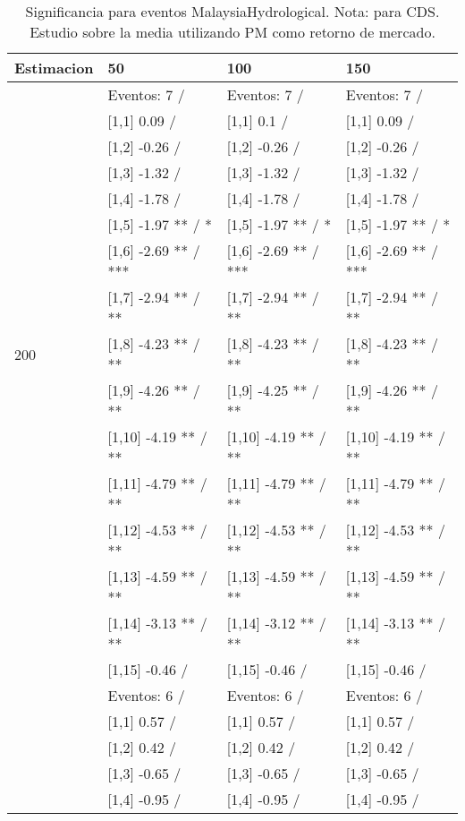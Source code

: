 \begin{table}

\caption{Significancia para eventos MalaysiaHydrological. Nota: para CDS. Estudio sobre la media utilizando PM como retorno de mercado.}
\centering
\begin{tabular}[t]{llll}
\toprule
Estimacion & 50 & 100 & 150\\
\midrule
 & Eventos:  7 / & Eventos:  7 / & Eventos:  7 /\\
 & {}[1,1] 0.09  / & {}[1,1] 0.1  / & {}[1,1] 0.09  /\\
 & {}[1,2] -0.26  / & {}[1,2] -0.26  / & {}[1,2] -0.26  /\\
 & {}[1,3] -1.32  / & {}[1,3] -1.32  / & {}[1,3] -1.32  /\\
 & {}[1,4] -1.78  / & {}[1,4] -1.78  / & {}[1,4] -1.78  /\\
\addlinespace
 & {}[1,5] -1.97 ** / * & {}[1,5] -1.97 ** / * & {}[1,5] -1.97 ** / *\\
 & {}[1,6] -2.69 ** / *** & {}[1,6] -2.69 ** / *** & {}[1,6] -2.69 ** / ***\\
 & {}[1,7] -2.94 ** / ** & {}[1,7] -2.94 ** / ** & {}[1,7] -2.94 ** / **\\
200 & {}[1,8] -4.23 ** / ** & {}[1,8] -4.23 ** / ** & {}[1,8] -4.23 ** / **\\
 & {}[1,9] -4.26 ** / ** & {}[1,9] -4.25 ** / ** & {}[1,9] -4.26 ** / **\\
\addlinespace
 & {}[1,10] -4.19 ** / ** & {}[1,10] -4.19 ** / ** & {}[1,10] -4.19 ** / **\\
 & {}[1,11] -4.79 ** / ** & {}[1,11] -4.79 ** / ** & {}[1,11] -4.79 ** / **\\
 & {}[1,12] -4.53 ** / ** & {}[1,12] -4.53 ** / ** & {}[1,12] -4.53 ** / **\\
 & {}[1,13] -4.59 ** / ** & {}[1,13] -4.59 ** / ** & {}[1,13] -4.59 ** / **\\
 & {}[1,14] -3.13 ** / ** & {}[1,14] -3.12 ** / ** & {}[1,14] -3.13 ** / **\\
\addlinespace
 & {}[1,15] -0.46  / & {}[1,15] -0.46  / & {}[1,15] -0.46  /\\
 & Eventos:  6 / & Eventos:  6 / & Eventos:  6 /\\
 & {}[1,1] 0.57  / & {}[1,1] 0.57  / & {}[1,1] 0.57  /\\
 & {}[1,2] 0.42  / & {}[1,2] 0.42  / & {}[1,2] 0.42  /\\
 & {}[1,3] -0.65  / & {}[1,3] -0.65  / & {}[1,3] -0.65  /\\
\addlinespace
 & {}[1,4] -0.95  / & {}[1,4] -0.95  / & {}[1,4] -0.95  /\\

\end{tabular}
\end{table}
